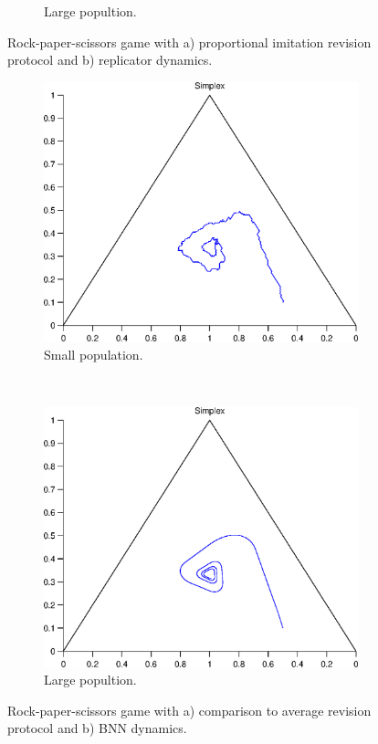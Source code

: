 \documentclass[a4paper,10pt]{article}
\begin{document}
\begin{figure}[th]
\begin{subfigure}[b]{0.4\textwidth}
	  \caption{Large popultion.}
	  \label{fig:finite1_dynamics}
  \end{subfigure}
  \caption{Rock-paper-scissors game with a) proportional imitation revision protocol and b) replicator dynamics.}
  \label{fig:finite1}
\end{figure}


\begin{figure}[th]
  \centering
  \begin{subfigure}[b]{0.4\textwidth}
	  \includegraphics[width=\textwidth]{./images/test_finite_comparison2average.eps}
	  \caption{Small population.}
	  \label{fig:finite2_protocol}
  \end{subfigure}
  ~ 
  \begin{subfigure}[b]{0.4\textwidth}
	  \includegraphics[width=\textwidth]{./images/test1_simplex_bnn.eps}
	  \caption{Large popultion.}
	  \label{fig:finite2_dynamics}
  \end{subfigure}
  \caption{Rock-paper-scissors game with a) comparison to average revision protocol and b) BNN dynamics.}
  \label{fig:finite2}
\end{figure}
\end{document}
